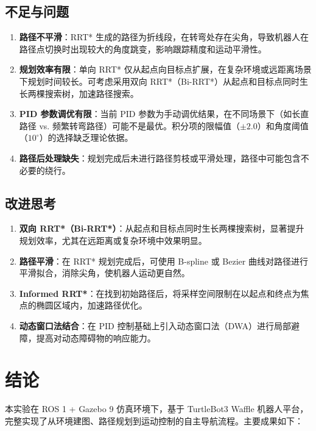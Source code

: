 \documentclass{SYSUReport}
\begin{document}
\subsection{不足与问题}

\begin{enumerate}
    \item \textbf{路径不平滑}：RRT* 生成的路径为折线段，在转弯处存在尖角，导致机器人在路径点切换时出现较大的角度跳变，影响跟踪精度和运动平滑性。
    \item \textbf{规划效率有限}：单向 RRT* 仅从起点向目标点扩展，在复杂环境或远距离场景下规划时间较长。可考虑采用双向 RRT*（Bi-RRT*）从起点和目标点同时生长两棵搜索树，加速路径搜索。
    \item \textbf{PID 参数调优有限}：当前 PID 参数为手动调优结果，在不同场景下（如长直路径 vs. 频繁转弯路径）可能不是最优。积分项的限幅值（$\pm 2.0$）和角度阈值（$10^\circ$）的选择缺乏理论依据。
    \item \textbf{路径后处理缺失}：规划完成后未进行路径剪枝或平滑处理，路径中可能包含不必要的绕行。
\end{enumerate}

\subsection{改进思考}

\begin{enumerate}
    \item \textbf{双向 RRT*（Bi-RRT*）}：从起点和目标点同时生长两棵搜索树，显著提升规划效率，尤其在远距离或复杂环境中效果明显。
    \item \textbf{路径平滑}：在 RRT* 规划完成后，可使用 B-spline 或 Bezier 曲线对路径进行平滑拟合，消除尖角，使机器人运动更自然。
    \item \textbf{Informed RRT*}：在找到初始路径后，将采样空间限制在以起点和终点为焦点的椭圆区域内，加速路径优化。
    \item \textbf{动态窗口法结合}：在 PID 控制基础上引入动态窗口法（DWA）进行局部避障，提高对动态障碍物的响应能力。
\end{enumerate}

\section{结论}

本实验在 ROS 1 + Gazebo 9 仿真环境下，基于 TurtleBot3 Waffle 机器人平台，完整实现了从环境建图、路径规划到运动控制的自主导航流程。主要成果如下：
\end{document}
